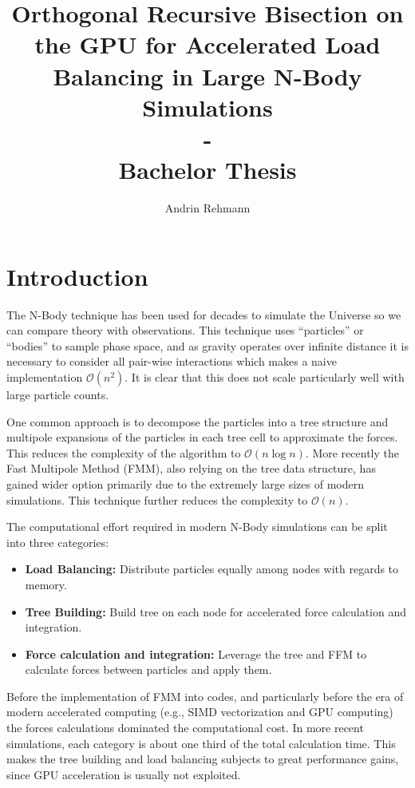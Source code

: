\documentclass[]{article}
\title{Orthogonal Recursive Bisection on the GPU for Accelerated Load Balancing in Large N-Body Simulations \\ - \\ Bachelor Thesis}
\author{Andrin Rehmann}
\begin{document}
\maketitle

\newpage

\tableofcontents

\newpage
\section{Introduction}

The N-Body technique has been used for decades to simulate the Universe so we can compare theory with observations. This technique uses ``particles'' or ``bodies'' to sample phase space, and as gravity operates over infinite distance it is necessary to consider all pair-wise interactions which makes a naive implementation $\mathcal{O}(n^2)$.
It is clear that this does not scale particularly well with large particle counts.

One common approach is to decompose the particles into a tree structure and multipole expansions of the particles in each tree cell to approximate the forces. This reduces the complexity of the algorithm to $\mathcal{O}(n\log{}n)$. More recently the Fast Multipole Method (FMM), also relying on the tree data structure, has gained wider option primarily due to the extremely large sizes of modern simulations. This technique further reduces the complexity to $\mathcal{O}(n)$. 

The computational effort required in modern N-Body simulations can be split into three categories:

\begin{itemize}
	\item \textbf{Load Balancing:} Distribute particles equally among nodes with regards to memory.
	\item \textbf{Tree Building:} Build tree on each node for accelerated force calculation and integration.
	\item \textbf{Force calculation and integration:} Leverage the tree and FFM to calculate forces between particles and apply them.
\end{itemize}

Before the implementation of FMM into codes, and particularly before the era of modern accelerated computing (e.g., SIMD vectorization and GPU computing) the forces calculations dominated the computational cost. In more recent simulations, each category is about one third of the total calculation time\cite{2017ComAC...4....2P}. This makes the tree building and load balancing subjects to great performance gains, since GPU acceleration is usually not exploited. 
\end{document}
